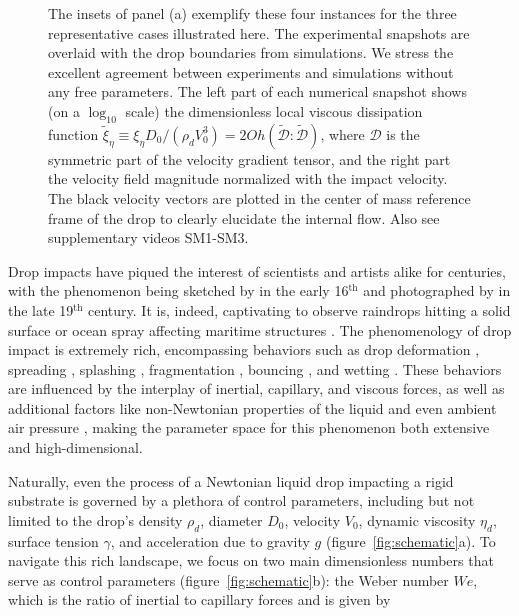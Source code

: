 \documentclass{jfm}
\begin{document}
\begin{figure}
{			The insets of panel (a) exemplify these four instances for the three representative cases illustrated here. The experimental snapshots are overlaid with the drop boundaries from simulations. 
			We stress the excellent agreement between experiments and simulations without any free parameters.
			The left part of each numerical snapshot shows (on a $\log_{10}$ scale) the dimensionless local viscous dissipation function $\tilde{\xi}_\eta \equiv \xi_\eta D_0/\left(\rho_dV_0^3\right) = 2Oh\left(\boldsymbol{\tilde{\mathcal{D}}:\tilde{\mathcal{D}}}\right)$, where $\boldsymbol{\mathcal{D}}$ is the symmetric part of the velocity gradient tensor, and the right part the velocity field magnitude normalized with the impact velocity. The black velocity vectors are plotted in the center of mass reference frame of the drop to clearly elucidate the internal flow.  Also see supplementary videos SM1-SM3.}
		\label{fig:summary}
	\end{figure}
	
	Drop impacts have piqued the interest of scientists and artists alike for centuries, with the phenomenon being sketched by \citet{da1508notebooks} in the early 16$^{\text{th}}$ and photographed by \citet{worthington1876, worthington1876b} in the late 19$^{\text{th}}$ century. It is, indeed, captivating to observe raindrops hitting a solid surface \citep{kim2020raindrop, lohse-2020-pnas} or ocean spray affecting maritime structures \citep{berny2021statistics, villermaux2022bubbles}. The phenomenology of drop impact is extremely rich, encompassing behaviors such as drop deformation \citep{Biance2006, molavcek2012quasi, chevy2012liquid}, spreading \citep{laan2014maximum, Wildeman2016}, splashing \citep{xu2005drop, riboux2014experiments, thoraval2021nanoscopic}, fragmentation \citep{villermaux2011drop, villermaux2020fragmentation}, bouncing \citep{Richard2000, kolinski-2014-epl, Jha2020, chubynsky-2020-prl, sharma-2021-jfm, sanjay_chantelot_lohse_2023}, and wetting \citep{degennes-1985-rmp, fukai-1995-pof, quere-2008-arms, Bonn2009}. These behaviors are influenced by the interplay of inertial, capillary, and viscous forces, as well as additional factors like non-Newtonian properties \citep{bartolo2005retraction, bartolo2007dynamics,  smith-2010-prl, gorin-2022-langmuir} of the liquid and even ambient air pressure \citep{xu2005drop}, making the parameter space for this phenomenon both extensive and high-dimensional. 
	
	Naturally, even the process of a Newtonian liquid drop impacting a rigid substrate is governed by a plethora of control parameters, including but not limited to the drop's density $\rho_d$, diameter $D_0$, velocity $V_0$, dynamic viscosity $\eta_d$, surface tension $\gamma$, and acceleration due to gravity $g$ (figure~\ref{fig:schematic}a). 
	To navigate this rich landscape, we focus on two main dimensionless numbers that serve as control parameters (figure~\ref{fig:schematic}b): the Weber number $We$, which is the ratio of inertial to capillary forces and is given by
	
\end{document}

